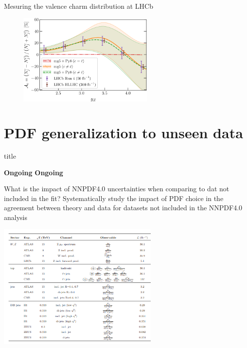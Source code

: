 \documentclass[aspectratio=43, 8pt,t]{beamer}
\newcommand{\SectionTitleFrame}[1][]{%
  \begin{frame}
    \vfill
    \centering
    \begin{beamercolorbox}[sep=8pt,center,shadow=true,rounded=true]{title}
      \usebeamerfont{title}\insertsection\par
    \end{beamercolorbox}
    \ifx\relax#1\relax\else
      \vspace{0.5cm}
      \textbf{#1}
    \fi
    \vfill
  \end{frame}
}
\begin{document}
\begin{frame}{Mesuring the valence charm distribution at LHCb}
  \begin{figure}
    \includegraphics[width=0.6\textwidth]{lhcb-zcharm-pheno-asymm.pdf}
  \end{figure}
\end{frame}



\section*{PDF generalization to unseen data}
\SectionTitleFrame[\textbf{Ongoing}]

\begin{frame}{What is the impact of NNPDF4.0 uncertainties when comparing to dat not included in the fit?}
  Systematically study the impact of PDF choice in the agreement between theory and data for datasets not included in the NNPDF4.0 analysis

  \includegraphics[width=0.6\textwidth]{pheno_paper_datastes.png}

\end{frame}
\end{document}

